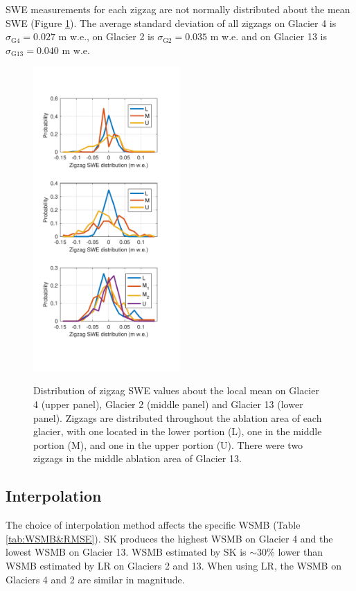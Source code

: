 \documentclass[twocolumn,letterpaper]{igs}
\begin{document}
SWE measurements for each zigzag are not normally distributed about the mean SWE (Figure \ref{fig:ZigzagHistogram}). The average standard deviation of all zigzags on Glacier 4 is $\sigma_{\mathrm{G4}} =  0.027$ m w.e., on Glacier 2 is $\sigma_{\mathrm{G2}} =  0.035$ m w.e. and on Glacier 13 is $\sigma_{\mathrm{G13}} =  0.040$ m w.e.

\begin{figure}
	\centering
	\includegraphics[width =0.5\textwidth]{ZigzagHistogram.pdf}\\
	\caption{Distribution of zigzag SWE values about the local mean on Glacier 4 (upper panel), Glacier 2 (middle panel) and Glacier 13 (lower panel). Zigzags are distributed throughout the ablation area of each glacier, with one located in the lower portion (L), one in the middle portion (M), and one in the upper portion (U). There were two zigzags in the middle ablation area of Glacier 13.}
	\label{fig:ZigzagHistogram}
\end{figure}

\subsection{Interpolation}

The choice of interpolation method affects the specific WSMB (Table \ref{tab:WSMB&RMSE}). SK produces the highest WSMB on Glacier 4 and the lowest WSMB on Glacier 13. WSMB estimated by SK is $\sim$30\% lower than WSMB estimated by LR on Glaciers 2 and 13. When using LR, the WSMB on Glaciers 4 and 2 are similar in magnitude.
\end{document}
